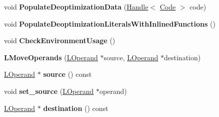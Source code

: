 \begin{DoxyCompactItemize}
\item 
void {\bfseries Populate\+Deoptimization\+Data} (\hyperlink{classv8_1_1internal_1_1_handle}{Handle}$<$ \hyperlink{classv8_1_1internal_1_1_code}{Code} $>$ code)\hypertarget{classv8_1_1internal_1_1_b_a_s_e___e_m_b_e_d_d_e_d_a3f391ee60297725a2cd0dbcd147b74a8}{}\label{classv8_1_1internal_1_1_b_a_s_e___e_m_b_e_d_d_e_d_a3f391ee60297725a2cd0dbcd147b74a8}

\item 
void {\bfseries Populate\+Deoptimization\+Literals\+With\+Inlined\+Functions} ()\hypertarget{classv8_1_1internal_1_1_b_a_s_e___e_m_b_e_d_d_e_d_ad61aa11a1eee2ac2dfac7e44d7c9b74b}{}\label{classv8_1_1internal_1_1_b_a_s_e___e_m_b_e_d_d_e_d_ad61aa11a1eee2ac2dfac7e44d7c9b74b}

\item 
void {\bfseries Check\+Environment\+Usage} ()\hypertarget{classv8_1_1internal_1_1_b_a_s_e___e_m_b_e_d_d_e_d_ae85b03b6949a28a441da98693c95775b}{}\label{classv8_1_1internal_1_1_b_a_s_e___e_m_b_e_d_d_e_d_ae85b03b6949a28a441da98693c95775b}

\item 
{\bfseries L\+Move\+Operands} (\hyperlink{classv8_1_1internal_1_1_l_operand}{L\+Operand} $\ast$source, \hyperlink{classv8_1_1internal_1_1_l_operand}{L\+Operand} $\ast$destination)\hypertarget{classv8_1_1internal_1_1_b_a_s_e___e_m_b_e_d_d_e_d_a842295a61f99f36e8efcf8cf7adeb77a}{}\label{classv8_1_1internal_1_1_b_a_s_e___e_m_b_e_d_d_e_d_a842295a61f99f36e8efcf8cf7adeb77a}

\item 
\hyperlink{classv8_1_1internal_1_1_l_operand}{L\+Operand} $\ast$ {\bfseries source} () const \hypertarget{classv8_1_1internal_1_1_b_a_s_e___e_m_b_e_d_d_e_d_a638193ab0bc1c931c007f319a0a9228c}{}\label{classv8_1_1internal_1_1_b_a_s_e___e_m_b_e_d_d_e_d_a638193ab0bc1c931c007f319a0a9228c}

\item 
void {\bfseries set\+\_\+source} (\hyperlink{classv8_1_1internal_1_1_l_operand}{L\+Operand} $\ast$operand)\hypertarget{classv8_1_1internal_1_1_b_a_s_e___e_m_b_e_d_d_e_d_a8b8ea4fa650a29c07545cb6cd1cb77b6}{}\label{classv8_1_1internal_1_1_b_a_s_e___e_m_b_e_d_d_e_d_a8b8ea4fa650a29c07545cb6cd1cb77b6}

\item 
\hyperlink{classv8_1_1internal_1_1_l_operand}{L\+Operand} $\ast$ {\bfseries destination} () const \hypertarget{classv8_1_1internal_1_1_b_a_s_e___e_m_b_e_d_d_e_d_ae1aa2cdbc2e77678b0785b42fd759968}{}\label{classv8_1_1internal_1_1_b_a_s_e___e_m_b_e_d_d_e_d_ae1aa2cdbc2e77678b0785b42fd759968}


\end{DoxyCompactItemize}
